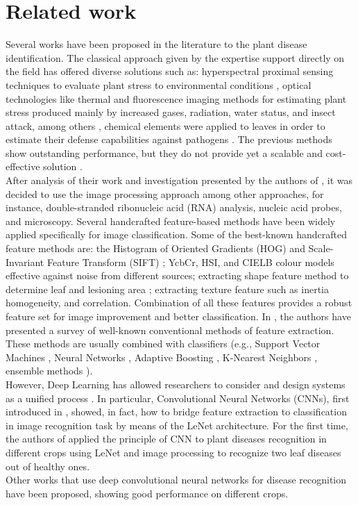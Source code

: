 \section{Related work}
Several works have been proposed in the literature to the plant disease identification. The classical approach given by the expertise support directly on the field has offered diverse solutions such as: hyperspectral proximal sensing techniques to evaluate plant stress to environmental conditions \cite{ref14}, optical technologies like thermal and fluorescence imaging methods for estimating plant stress produced mainly by increased gases, radiation, water status, and insect attack, among others \cite{ref15}, chemical elements were applied to leaves in order to estimate their defense capabilities against pathogens \cite{ref16}. The previous methods show outstanding performance, but they do not provide yet a scalable and cost-effective solution \cite{ref17}.
\\\indent
After analysis of their work and investigation presented by the authors of \cite{ref18, ref19}, it was decided to use the image processing approach among other approaches, for instance, double-stranded ribonucleic acid (RNA) analysis, nucleic acid probes, and microscopy. Several handcrafted feature-based methods have been widely applied specifically for image classification. Some of the best-known handcrafted feature methods are: the Histogram of Oriented Gradients (HOG) \cite{ref20} and Scale-Invariant Feature Transform (SIFT) \cite{ref21}; YcbCr, HSI, and CIELB colour models \cite{ref22} effective against noise from different sources; extracting shape feature method to determine leaf and lesioning area \cite{ref23}; extracting texture feature such as inertia homogeneity, and correlation. Combination of all these features provides a robust feature set for image improvement and better classification. In \cite{ref28}, the authors have presented a survey of well-known conventional methods of feature extraction. These methods are usually combined with classifiers (e.g., Support Vector Machines \cite{ref24}, Neural Networks \cite{ref25}, Adaptive Boosting \cite{ref26}, K-Nearest Neighbors \cite{ref27}, ensemble methods \cite{ref28}). 
\\\indent
However, Deep Learning has allowed researchers to consider and design systems as a unified process \cite{ref29}. In particular, Convolutional Neural Networks (CNNs), first introduced in \cite{ref30}, showed, in fact, how to bridge feature extraction to classification in image recognition task by means of the LeNet architecture. For the first time, the authors of \cite{ref31} applied the principle of CNN to plant diseases recognition in different crops using LeNet and image processing to recognize two leaf diseases out of healthy ones. 
\\\indent
Other works that use deep convolutional neural networks for disease recognition have been proposed, showing good performance on different crops.